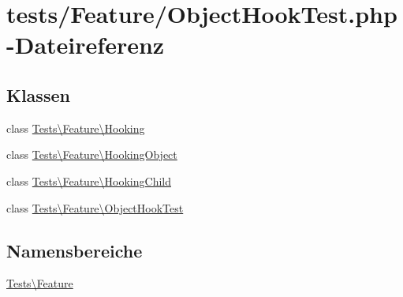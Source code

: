 \hypertarget{ObjectHookTest_8php}{}\section{tests/\+Feature/\+Object\+Hook\+Test.php-\/\+Dateireferenz}
\label{ObjectHookTest_8php}
\subsection*{Klassen}
\begin{DoxyCompactItemize}
\item 
class \hyperlink{classTests_1_1Feature_1_1Hooking}{Tests\textbackslash{}\+Feature\textbackslash{}\+Hooking}
\item 
class \hyperlink{classTests_1_1Feature_1_1HookingObject}{Tests\textbackslash{}\+Feature\textbackslash{}\+Hooking\+Object}
\item 
class \hyperlink{classTests_1_1Feature_1_1HookingChild}{Tests\textbackslash{}\+Feature\textbackslash{}\+Hooking\+Child}
\item 
class \hyperlink{classTests_1_1Feature_1_1ObjectHookTest}{Tests\textbackslash{}\+Feature\textbackslash{}\+Object\+Hook\+Test}
\end{DoxyCompactItemize}
\subsection*{Namensbereiche}
\begin{DoxyCompactItemize}
\item 
 \hyperlink{namespaceTests_1_1Feature}{Tests\textbackslash{}\+Feature}
\end{DoxyCompactItemize}
